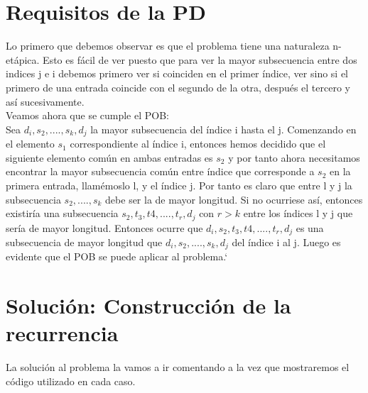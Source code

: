 \documentclass[10pt,a4paper]{article}
\begin{document}
\section{Requisitos de la PD}
Lo primero que debemos observar es que el problema tiene una naturaleza n-etápica. Esto es fácil de ver puesto que para ver la mayor subsecuencia entre dos indices j e i debemos primero ver si coinciden en el primer índice, ver sino si el primero de una entrada coincide con el segundo de la otra, después el tercero y así sucesivamente.
\\
Veamos ahora que se cumple el POB:	\\
Sea $ d_i, s_2,...., s_k, d_j$ la mayor subsecuencia del índice i hasta el j.
Comenzando en el elemento $s_1$ correspondiente al índice i, entonces hemos decidido que el siguiente elemento común en ambas entradas es $s_2$ y por tanto ahora necesitamos encontrar la mayor subsecuencia común entre índice que corresponde a $s_2$ en la primera entrada, llamémoslo l, y el índice j. Por tanto es claro que entre l y j la subsecuencia $s_2,...., s_k$ debe ser la de mayor longitud. Si no ocurriese así, entonces existiría una subsecuencia $s_2, t_3, t4, ...., t_r, d_j$ con $r>k$ entre los índices l y j que sería de mayor longitud. Entonces ocurre que $d_i, s_2, t_3, t4, ...., t_r, d_j$ es una subsecuencia de mayor longitud que $ d_i, s_2,...., s_k, d_j$ del índice i al j. Luego es evidente que el POB se puede aplicar al problema.`

\section{Solución: Construcción de la recurrencia}
La solución al problema la vamos a ir comentando a la vez que mostraremos el código utilizado en cada caso.
\\
\end{document}
